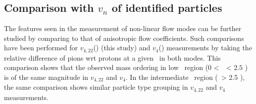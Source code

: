 \begin{table}[!h]
\centering
{}
\caption{List of minimum and maximum value of the fit to relative ratios between the data and each model for  $v_{n} (n=2,3,4)$  of \pion, \kaon~and \proton. The minimum and maximum are obtained from 0-5\% up to 40-50\% centrality intervals .}\label{ModelDataComparisonflow}
\end{table}

\subsection{Comparison with $v_{n}$ of identified particles}
\label{SubSec:comparewithvn}

The features seen in the measurement of non-linear flow modes can be further studied by comparing to that of anisotropic flow coefficients. Such comparisons have been performed for $v_{4,22}$(\pT) (this study) and $v_{4}$(\pT) measurements \cite{Acharya:2018zuq} by taking the relative difference of pions wrt protons at a given \pT~in both modes. This comparison shows that the observed mass ordering in low \pT~region ($0$ <~\pT~< $2.5$ \GeV) is of the same magnitude in $v_{4,22}$ and $v_{4}$. In the intermediate \pT~region (\pT~> 2.5 \GeV), the same comparison shows similar particle type grouping in  $v_{4,22}$ and $v_{4}$ measurements. 

\newpage